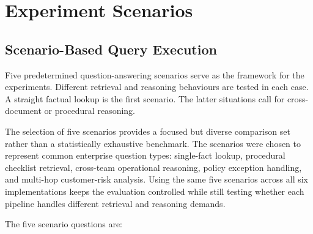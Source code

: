 \section{Experiment Scenarios}

\subsection{Scenario-Based Query Execution}
Five predetermined question-answering scenarios serve as the framework for the experiments. Different retrieval and reasoning behaviours are tested in each case. A straight factual lookup is the first scenario. The latter situations call for cross-document or procedural reasoning.

The selection of five scenarios provides a focused but diverse comparison set rather than a statistically exhaustive benchmark. The scenarios were chosen to represent common enterprise question types: single-fact lookup, procedural checklist retrieval, cross-team operational reasoning, policy exception handling, and multi-hop customer-risk analysis. Using the same five scenarios across all six implementations keeps the evaluation controlled while still testing whether each pipeline handles different retrieval and reasoning demands.

The five scenario questions are:

